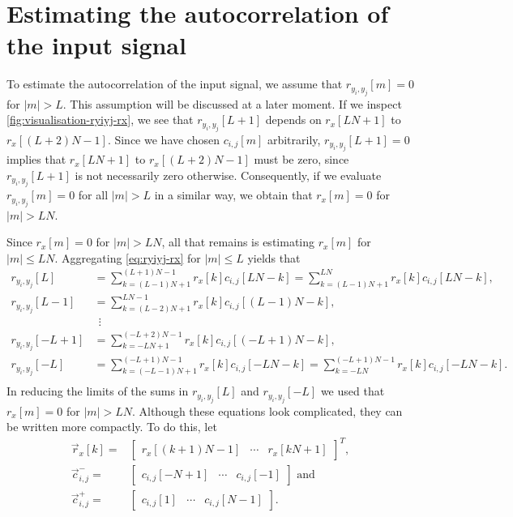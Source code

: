 \documentclass[a4paper, openany, oneside]{memoir}
\begin{document}
\section{Estimating the autocorrelation of the input signal}
To estimate the autocorrelation of the input signal, we assume that $r_{y_i,y_j}[m]=0$ for $|m| > L$. This assumption will be discussed at a later moment. If we inspect \cref{fig:visualisation-ryiyj-rx}, we see that $r_{y_i,y_j}[L+1]$ depends on $r_x[LN+1]$ to $r_x[(L+2)N-1]$. Since we have chosen $c_{i,j}[m]$ arbitrarily, $r_{y_i,y_j}[L+1]=0$ implies that $r_x[LN+1]$ to $r_x[(L+2)N-1]$ must be zero, since $r_{y_i,y_j}[L+1]$ is not necessarily zero otherwise. Consequently, if we evaluate $r_{y_i,y_j}[m]=0$ for all $|m| > L$ in a similar way, we obtain that $r_x[m]=0$ for $|m| > LN$.

Since $r_x[m]=0$ for $|m| > LN$, all that remains is estimating $r_x[m]$ for $|m| \le LN$. Aggregating \cref{eq:ryiyj-rx} for $|m| \le L$ yields that
\begin{align*}
    r_{y_i,y_j}[L] &= \sum_{k=(L-1)N+1}^{(L+1)N-1}r_{x}[k]c_{i,j}[LN-k] = \sum_{k=(L-1)N+1}^{LN}r_{x}[k]c_{i,j}[LN-k], \\
    r_{y_i,y_j}[L-1] &= \sum_{k=(L-2)N+1}^{LN-1}r_{x}[k]c_{i,j}[(L-1)N-k], \\
    &~~\vdots \\
    r_{y_i,y_j}[-L+1] &= \sum_{k=-LN+1}^{(-L+2)N-1}r_{x}[k]c_{i,j}[(-L+1)N-k], \\
    r_{y_i,y_j}[-L] &= \sum_{k=(-L-1)N+1}^{(-L+1)N-1}r_{x}[k]c_{i,j}[-LN-k] = \sum_{k=-LN}^{(-L+1)N-1}r_{x}[k]c_{i,j}[-LN-k]. \\
\end{align*}
In reducing the limits of the sums in $r_{y_i,y_j}[L]$ and $r_{y_i,y_j}[-L]$ we used that $r_x[m]=0$ for $|m| > LN$. Although these equations look complicated, they can be written more compactly. To do this, let
\begin{align} \label{eq:def-rx}
    \vec{r}_x[k] =& \begin{bmatrix}
        r_x[(k+1)N-1] & \cdots & r_x[kN+1]
    \end{bmatrix}^T, \\
    \vec{c}^{-}_{i,j} =& \begin{bmatrix}
        c_{i,j}[-N+1] & \cdots & c_{i,j}[-1]
    \end{bmatrix} \text{ and } \nonumber \\
    \vec{c}^{+}_{i,j} =& \begin{bmatrix}
        c_{i,j}[1] & \cdots & c_{i,j}[N-1]
    \end{bmatrix}. \nonumber
\end{align}
\end{document}
